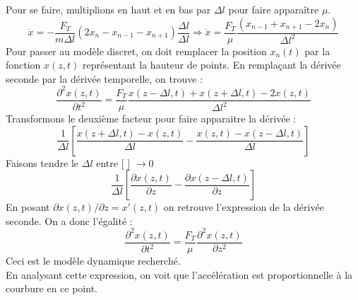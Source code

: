 \documentclass	[11pt, a4paper, openany]{book}
\begin{document}
		Pour se faire, multiplions en haut et en bas par $\Delta l$ pour faire apparaître $\mu$.
		\begin{equation}
			\ddot{x} = -\frac{F_T}{m\Delta l}(2x_n - x_{n-1} - x_{n+1})\frac{\Delta l}{\Delta l} \Rightarrow \ddot{x} = \frac{F_T}{\mu}\frac{(x_{n-1} + x_{n+1} - 2x_n)}{\Delta l^2}
		\end{equation}
		Pour passer au modèle discret, on doit remplacer la position $x_n(t)$ par la fonction $x(z,t)$ représentant la hauteur de points. En remplaçant la dérivée seconde par la dérivée temporelle, on trouve : 
		\begin{equation}
			\frac{\partial^2 x(z, t)}{\partial t^2} = \frac{F_T}{\mu}\frac{x(z-\Delta l, t) + x(z+\Delta l, t) -2x(z, t)}{\Delta l^2}
		\end{equation}
		Transformons le deuxième facteur pour faire apparaitre la dérivée : 
		\begin{equation}
			\frac{1}{\Delta l}\left[\frac{x(z+\Delta l, t) - x(z, t)}{\Delta l} - \frac{x(z, t) - x(z-\Delta l, t)}{\Delta l}\right]
		\end{equation}
		Faisons tendre le $\Delta l$ entre [ ] $\rightarrow 0$
		\begin{equation}
			\frac{1}{\Delta l}\left[\frac{\partial x(z, t)}{\partial z} - \frac{\partial x(z -\Delta l, t)}{\partial z}\right]
		\end{equation}
		En posant $\partial x(z, t)/\partial z = x'(z, t)$ on retrouve l'expression de la dérivée seconde. On a donc l'égalité :
		\begin{equation}
			\frac{\partial^2 x(z, t)}{\partial t^2} = \frac{F_T}{\mu}\frac{\partial^2 x(z, t)}{\partial z^2}
		\end{equation}
		Ceci est le modèle dynamique recherché.\\
		En analysant cette expression, on voit que l'accélération  est proportionnelle à la courbure en ce point.
		
\end{document}
